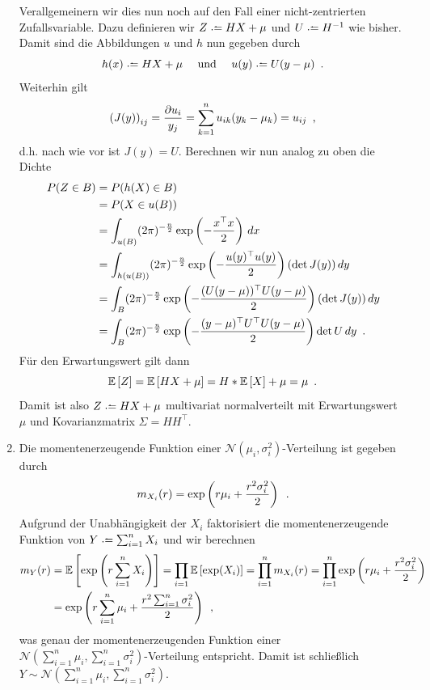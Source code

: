 \documentclass[ngerman, a4paper, 11pt]{article}
\theoremstyle{plain}
\theoremstyle{plain}
\theoremstyle{proofstyle}
\newcommand{\satzende}{\enskip \text{.}}
\newcommand{\komma}{\enskip \text{,}}
\begin{document}
\begin{exercisePage}
\begin{enumerate}[label=(\alph*), leftmargin=*]
	Verallgemeinern wir dies nun noch auf den Fall einer nicht-zentrierten Zufallsvariable. Dazu definieren wir $Z \defeq H X + \mu$ und $U \defeq H^{-1}$ wie bisher. Damit sind die Abbildungen $u$ und $h$ nun gegeben durch
	\begin{equation*}
		h( x) \defeq H X + \mu \quad \und \quad u( y) \defeq U  (y - \mu) \satzende
	\end{equation*}
	Weiterhin gilt 
	\begin{equation*}
		\brackets{J( y)}_{ij} = \frac{\partial u_i}{y_j} = \sum_{k=1}^n u_{ik} (y_k - \mu_k) = u_{ij} \komma
	\end{equation*}
	d.h. nach wie vor ist $J( y) = U$. Berechnen wir nun analog zu oben die Dichte
	\begin{align*}
		P({ Z} \in B)&=P(h(X) \in B) \\
		&=P({ X} \in u(B)) \\
		&= \int_{u(B)} (2 \pi)^{-\frac{n}{2}} \exp \left( -\frac{{ x}^\top { x}}{2} \right) \, d { x} \\
		&= \int_{h(u(B))} (2 \pi)^{-\frac{n}{2}} \exp \left( -\frac{u({ y})^\top u({ y})}{2} \right) (\det J({ y})) \, d { y} \\
		&= \int_{B} (2 \pi)^{-\frac{n}{2}} \exp \left( -\frac{(U ({ y} - \mu))^\top U ({ y} - \mu)}{2} \right) (\det J({ y})) \, d { y} \\
		&= \int_{B} (2 \pi)^{-\frac{n}{2}} \exp \left( -\frac{({ y} - \mu)^\top U^\top U ({ y} - \mu)}{2} \right) \det{U} \, d { y}
		\satzende
	\end{align*}
	Für den Erwartungswert gilt dann
	\begin{equation*}
		\EW[Z] = \EW[HX + \mu] = H * \EW[X] + \mu = \mu \satzende
	\end{equation*}	
	Damit ist also $Z \defeq HX + \mu$ multivariat normalverteilt mit Erwartungswert $\mu$ und Kovarianzmatrix $\Sigma = HH^\top$.
	
	\item Die momentenerzeugende Funktion einer $\mathcal{N}(\mu_i, \sigma_i^2)$-Verteilung ist gegeben durch
	\begin{equation*}
		m_{X_i}(r) = \exp\brackets{r\mu_i + \frac{r^2 \sigma_i^2}{2}} \satzende
	\end{equation*}
	Aufgrund der Unabhängigkeit der $X_i$ faktorisiert die momentenerzeugende Funktion von $Y \defeq \sum_{i=1}^n X_i$ und wir berechnen
	\begin{equation*}
		\begin{aligned}
			m_Y(r) &= \EW[\exp\brackets{r \sum_{i=1}^n X_i}] = \prod_{i=1} \EW[\exp(X_i)] = \prod_{i=1}^n m_{X_i}(r) = \prod_{i=1}^n \exp\brackets{r\mu_i + \frac{r^2 \sigma_i^2}{2}} \\
			&= \exp\brackets{r \sum_{i=1}^n \mu_i + \frac{r^2 \sum_{i=1}^n \sigma_i^2}{2}} \komma
		\end{aligned}
	\end{equation*}
	was genau der momentenerzeugenden Funktion einer $\mathcal{N}(\sum_{i=1}^n \mu_i, \sum_{i=1}^n \sigma_i^2)$-Verteilung entspricht. Damit ist schließlich $Y \sim \mathcal{N}(\sum_{i=1}^n \mu_i, \sum_{i=1}^n \sigma_i^2)$.
	

\end{enumerate}
\end{exercisePage}
\end{document}

